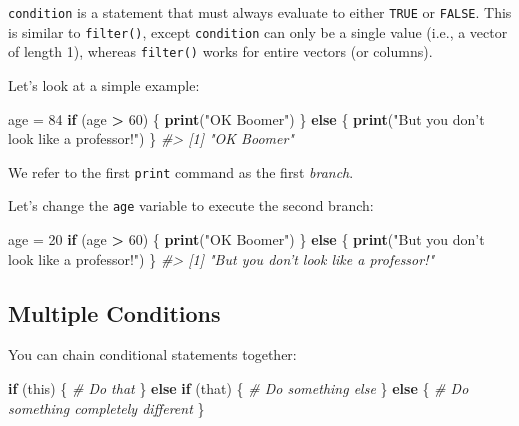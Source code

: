 \documentclass[
]{book}
\newenvironment{Shaded}{\begin{snugshade}}{\end{snugshade}}
\newcommand{\CommentTok}[1]{\textcolor[rgb]{0.56,0.35,0.01}{\textit{#1}}}
\newcommand{\ControlFlowTok}[1]{\textcolor[rgb]{0.13,0.29,0.53}{\textbf{#1}}}
\newcommand{\DecValTok}[1]{\textcolor[rgb]{0.00,0.00,0.81}{#1}}
\newcommand{\KeywordTok}[1]{\textcolor[rgb]{0.13,0.29,0.53}{\textbf{#1}}}
\newcommand{\NormalTok}[1]{#1}
\newcommand{\OperatorTok}[1]{\textcolor[rgb]{0.81,0.36,0.00}{\textbf{#1}}}
\newcommand{\StringTok}[1]{\textcolor[rgb]{0.31,0.60,0.02}{#1}}
\begin{document}
\texttt{condition} is a statement that must always evaluate to either \texttt{TRUE} or \texttt{FALSE}. This is similar to \texttt{filter()}, except \texttt{condition} can only be a single value (i.e., a vector of length 1), whereas \texttt{filter()} works for entire vectors (or columns).

Let's look at a simple example:

\begin{Shaded}
\begin{Highlighting}[]
\NormalTok{age =}\StringTok{ }\DecValTok{84}
\ControlFlowTok{if}\NormalTok{ (age }\OperatorTok{>}\StringTok{ }\DecValTok{60}\NormalTok{) \{}
    \KeywordTok{print}\NormalTok{(}\StringTok{"OK Boomer"}\NormalTok{)}
\NormalTok{\} }\ControlFlowTok{else}\NormalTok{ \{}
    \KeywordTok{print}\NormalTok{(}\StringTok{"But you don't look like a professor!"}\NormalTok{)}
\NormalTok{\}}
\CommentTok{#> [1] "OK Boomer"}
\end{Highlighting}
\end{Shaded}

We refer to the first \texttt{print} command as the first \emph{branch}.

Let's change the \texttt{age} variable to execute the second branch:

\begin{Shaded}
\begin{Highlighting}[]
\NormalTok{age =}\StringTok{ }\DecValTok{20}
\ControlFlowTok{if}\NormalTok{ (age }\OperatorTok{>}\StringTok{ }\DecValTok{60}\NormalTok{) \{}
    \KeywordTok{print}\NormalTok{(}\StringTok{"OK Boomer"}\NormalTok{)}
\NormalTok{\} }\ControlFlowTok{else}\NormalTok{ \{}
    \KeywordTok{print}\NormalTok{(}\StringTok{"But you don't look like a professor!"}\NormalTok{)}
\NormalTok{\}}
\CommentTok{#> [1] "But you don't look like a professor!"}
\end{Highlighting}
\end{Shaded}

\hypertarget{multiple-conditions}{%
\subsection{Multiple Conditions}\label{multiple-conditions}}

You can chain conditional statements together:

\begin{Shaded}
\begin{Highlighting}[]
\ControlFlowTok{if}\NormalTok{ (this) \{}
  \CommentTok{# Do that}
\NormalTok{\} }\ControlFlowTok{else} \ControlFlowTok{if}\NormalTok{ (that) \{}
  \CommentTok{# Do something else}
\NormalTok{\} }\ControlFlowTok{else}\NormalTok{ \{}
  \CommentTok{# Do something completely different}
\NormalTok{\}}
\end{Highlighting}
\end{Shaded}
\end{document}
